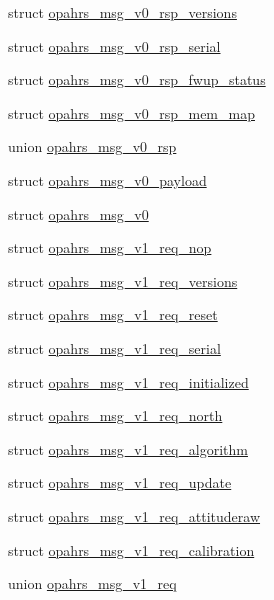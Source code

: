 \begin{DoxyCompactItemize}
\item 
struct \hyperlink{structopahrs__msg__v0__rsp__versions}{opahrs\-\_\-msg\-\_\-v0\-\_\-rsp\-\_\-versions}
\item 
struct \hyperlink{structopahrs__msg__v0__rsp__serial}{opahrs\-\_\-msg\-\_\-v0\-\_\-rsp\-\_\-serial}
\item 
struct \hyperlink{structopahrs__msg__v0__rsp__fwup__status}{opahrs\-\_\-msg\-\_\-v0\-\_\-rsp\-\_\-fwup\-\_\-status}
\item 
struct \hyperlink{structopahrs__msg__v0__rsp__mem__map}{opahrs\-\_\-msg\-\_\-v0\-\_\-rsp\-\_\-mem\-\_\-map}
\item 
union \hyperlink{unionopahrs__msg__v0__rsp}{opahrs\-\_\-msg\-\_\-v0\-\_\-rsp}
\item 
struct \hyperlink{structopahrs__msg__v0__payload}{opahrs\-\_\-msg\-\_\-v0\-\_\-payload}
\item 
struct \hyperlink{structopahrs__msg__v0}{opahrs\-\_\-msg\-\_\-v0}
\item 
struct \hyperlink{structopahrs__msg__v1__req__nop}{opahrs\-\_\-msg\-\_\-v1\-\_\-req\-\_\-nop}
\item 
struct \hyperlink{structopahrs__msg__v1__req__versions}{opahrs\-\_\-msg\-\_\-v1\-\_\-req\-\_\-versions}
\item 
struct \hyperlink{structopahrs__msg__v1__req__reset}{opahrs\-\_\-msg\-\_\-v1\-\_\-req\-\_\-reset}
\item 
struct \hyperlink{structopahrs__msg__v1__req__serial}{opahrs\-\_\-msg\-\_\-v1\-\_\-req\-\_\-serial}
\item 
struct \hyperlink{structopahrs__msg__v1__req__initialized}{opahrs\-\_\-msg\-\_\-v1\-\_\-req\-\_\-initialized}
\item 
struct \hyperlink{structopahrs__msg__v1__req__north}{opahrs\-\_\-msg\-\_\-v1\-\_\-req\-\_\-north}
\item 
struct \hyperlink{structopahrs__msg__v1__req__algorithm}{opahrs\-\_\-msg\-\_\-v1\-\_\-req\-\_\-algorithm}
\item 
struct \hyperlink{structopahrs__msg__v1__req__update}{opahrs\-\_\-msg\-\_\-v1\-\_\-req\-\_\-update}
\item 
struct \hyperlink{structopahrs__msg__v1__req__attituderaw}{opahrs\-\_\-msg\-\_\-v1\-\_\-req\-\_\-attituderaw}
\item 
struct \hyperlink{structopahrs__msg__v1__req__calibration}{opahrs\-\_\-msg\-\_\-v1\-\_\-req\-\_\-calibration}
\item 
union \hyperlink{unionopahrs__msg__v1__req}{opahrs\-\_\-msg\-\_\-v1\-\_\-req}

\end{DoxyCompactItemize}
